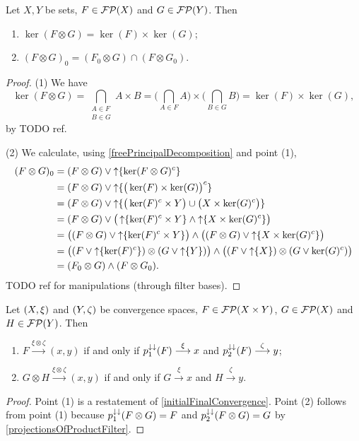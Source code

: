 \begin{proposition}
Let $X,Y$ be sets, $F\in\operatorname{\mathcal{FP}}(X)$ and $G\in \operatorname{\mathcal{FP}}(Y)$. Then
\begin{enumerate}
\item $\ker(F\otimes G) = \ker(F)\times\ker(G)$;
\item $(F\otimes G)_0 = (F_0\otimes G) \cap (F\otimes G_0)$.
\end{enumerate}
\end{proposition}
\begin{proof}
(1) We have
\[ \ker(F\otimes G) = \bigcap_{\substack{A\in F \\ B\in G}}A\times B = \Big(\bigcap_{A\in F}A\Big)\times \Big(\bigcap_{B\in G} B\Big) = \ker(F)\times \ker(G), \]
by TODO ref.

(2) We calculate, using \ref{freePrincipalDecomposition} and point (1),
\begin{align*}
(F\otimes G)_0 &= (F\otimes G) \vee \operatorname{\uparrow}\{\ker(F\otimes G)^c\} \\
&= (F\otimes G) \vee \operatorname{\uparrow}\{\big(\ker(F)\times \ker(G)\big)^c\} \\
&= (F\otimes G) \vee \operatorname{\uparrow}\{\big(\ker(F)^c\times Y\big) \cup \big(X\times \ker(G)^c\big)\} \\
&= (F\otimes G) \vee \big(\operatorname{\uparrow}\{\ker(F)^c\times Y\} \wedge \operatorname{\uparrow}\{X\times \ker(G)^c\}\big) \\
&= \big((F\otimes G)\vee \operatorname{\uparrow}\{\ker(F)^c\times Y\}\big) \wedge \big((F\otimes G)\vee \operatorname{\uparrow}\{X\times \ker(G)^c\}\big) \\
&= \big((F\vee \operatorname{\uparrow}\{\ker(F)^c\})\otimes (G\vee \operatorname{\uparrow}\{Y\})\big) \wedge \big((F\vee \operatorname{\uparrow}\{X\})\otimes (G\vee \ker(G)^c)\big) \\
&= (F_0\otimes G) \wedge (F\otimes G_0).
\end{align*}
TODO ref for manipulations (through filter bases).
\end{proof}


\begin{lemma} \label{convergenceFiniteProductFilter}
Let $\sSet{X,\xi}$ and $\sSet{Y,\zeta}$ be convergence spaces, $F\in \operatorname{\mathcal{FP}}(X\times Y)$, $G\in \operatorname{\mathcal{FP}}(X)$ and $H\in \operatorname{\mathcal{FP}}(Y)$. Then
\begin{enumerate}
\item $F \overset{\xi \otimes \zeta}{\longrightarrow} (x,y)$ \textup{if and only if} $p_1^{\downarrow\downarrow}(F) \overset{\xi}{\longrightarrow} x$ and $p_2^{\downarrow\downarrow}(F) \overset{\zeta}{\longrightarrow} y$;
\item $G\otimes H \overset{\xi \otimes \zeta}{\longrightarrow} (x,y)$ \textup{if and only if} $G \overset{\xi}{\longrightarrow} x$ and $H \overset{\zeta}{\longrightarrow} y$.
\end{enumerate}
\end{lemma}
\begin{proof}
Point (1) is a restatement of \ref{initialFinalConvergence}. Point (2) follows from point (1) because $p_1^{\downarrow\downarrow}(F\otimes G) = F$ and $p_2^{\downarrow\downarrow}(F\otimes G) = G$ by \ref{projectionsOfProductFilter}.
\end{proof}

